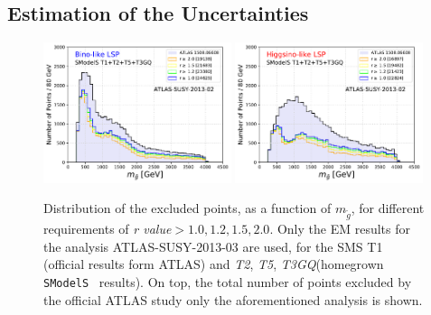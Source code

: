 \documentclass[a4paper,11pt]{article}
\newcommand{\SMO}{\texttt{SModelS\xspace}}
\newcommand{\MGLU}{$ m _{ \tilde g } $\xspace}
\newcommand{\RVALUE}{\textit{r value}}
\newcommand{\TGQ}{ \textit{T3GQ}}
\newcommand{\Ttwo}{ \textit{T2}}
\newcommand{\Tfive}{ \textit{T5}}
\begin{document}
\subsection{Estimation of the Uncertainties}\label{estimation}
\begin{figure}[!h]
	\begin{center}
		\subfigure
		{\includegraphics[width=0.49\textwidth]{PLOTS/Combination/Bino_TOT_GLU_Histo_rValue.pdf}}
		\subfigure
		{\includegraphics[width=0.49\textwidth]{PLOTS/Combination/Higgsino_TOT_GLU_Histo_rValue.pdf}}
	\end{center}
	\caption{Distribution of the excluded points, as a function of \MGLU, for different requirements of \RVALUE$>1.0,1.2,1.5,2.0$. Only the EM results for the analysis ATLAS-SUSY-2013-03 are used, for the SMS T1 (official results form ATLAS) and \Ttwo,\Tfive,\TGQ (homegrown \SMO~ results). On top, the total number of points excluded by the official ATLAS study only the aforementioned analysis is shown. } 
	\label{unc}
\end{figure}
\end{document}
